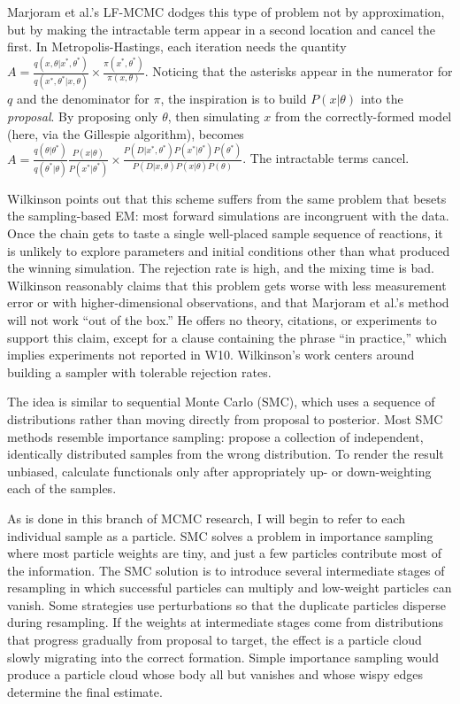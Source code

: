 \documentclass{article}
\begin{document}
Marjoram et al.'s LF-MCMC dodges this type of problem not by approximation, but by making the intractable term appear in a second location and cancel the first. In Metropolis-Hastings, each iteration needs the quantity $A=\frac{q(x, \theta|x^*, \theta^*)}{q(x^*, \theta^*|x, \theta)} \times \frac{\pi(x^*, \theta^*)}{\pi(x, \theta)}$. Noticing that the asterisks appear in the numerator for $q$ and the denominator for $\pi$, the inspiration is to build $P(x| \theta)$ into the {\it proposal}. By proposing only $\theta$, then simulating $x$ from the correctly-formed model (here, via the Gillespie algorithm), becomes $A=\frac{q(\theta|\theta^*)}{q(\theta^*|\theta)} \frac{P(x|\theta)}{P(x^*|\theta^*)} \times \frac{P(D|x^*, \theta^*)P(x^*|\theta^*)P(\theta^*)}{P(D|x, \theta)P(x| \theta)P(\theta)}$. The intractable terms cancel.

Wilkinson points out that this scheme suffers from the same problem that besets the sampling-based EM: most forward simulations are incongruent with the data. Once the chain gets to taste a single well-placed sample sequence of reactions, it is unlikely to explore parameters and initial conditions other than what produced the winning simulation. The rejection rate is high, and the mixing time is bad. Wilkinson reasonably claims that this problem gets worse with less measurement error or with higher-dimensional observations, and that Marjoram et al.'s method will not work ``out of the box.'' He offers no theory, citations, or experiments to support this claim, except for a clause containing the phrase ``in practice,'' which implies experiments not reported in W10. Wilkinson's work centers around building a sampler with tolerable rejection rates. 

The idea is similar to sequential Monte Carlo (SMC), which uses a sequence of distributions rather than moving directly from proposal to posterior. Most SMC methods resemble importance sampling: propose a collection of independent, identically distributed samples from the wrong distribution. To render the result unbiased, calculate functionals only after appropriately up- or down-weighting each of the samples. 

As is done in this branch of MCMC research, I will begin to refer to each individual sample as a particle. SMC solves a problem in importance sampling where most particle weights are tiny, and just a few particles contribute most of the information. The SMC solution is to introduce several intermediate stages of resampling in which successful particles can multiply and low-weight particles can vanish. Some strategies use perturbations so that the duplicate particles disperse during resampling. If the weights at intermediate stages come from distributions that progress gradually from proposal to target, the effect is a particle cloud slowly migrating into the correct formation. Simple importance sampling would produce a particle cloud whose body all but vanishes and whose wispy edges determine the final estimate. 
\end{document}

